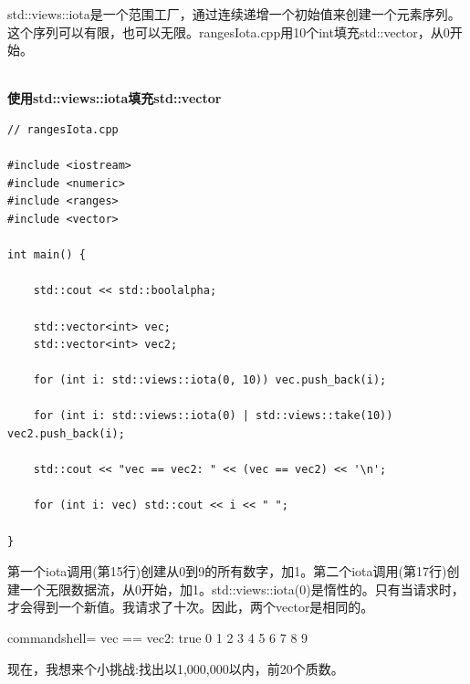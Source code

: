 
std::views::iota是一个范围工厂，通过连续递增一个初始值来创建一个元素序列。这个序列可以有限，也可以无限。rangesIota.cpp用10个int填充std::vector，从0开始。

\hspace*{\fill} \\ %
\noindent
\textbf{使用std::views::iota填充std::vector}
\begin{lstlisting}[style=styleCXX]
// rangesIota.cpp

#include <iostream>
#include <numeric>
#include <ranges>
#include <vector>

int main() {
	
	std::cout << std::boolalpha;
	
	std::vector<int> vec;
	std::vector<int> vec2;
	
	for (int i: std::views::iota(0, 10)) vec.push_back(i);
	
	for (int i: std::views::iota(0) | std::views::take(10)) vec2.push_back(i);
	
	std::cout << "vec == vec2: " << (vec == vec2) << '\n';
	
	for (int i: vec) std::cout << i << " ";

}
\end{lstlisting}

第一个iota调用(第15行)创建从0到9的所有数字，加1。第二个iota调用(第17行)创建一个无限数据流，从0开始，加1。std::views::iota(0)是惰性的。只有当请求时，才会得到一个新值。我请求了十次。因此，两个vector是相同的。

\begin{tcblisting}{commandshell={}}
vec == vec2: true
0 1 2 3 4 5 6 7 8 9
\end{tcblisting}

现在，我想来个小挑战:找出以1,000,000以内，前20个质数。

